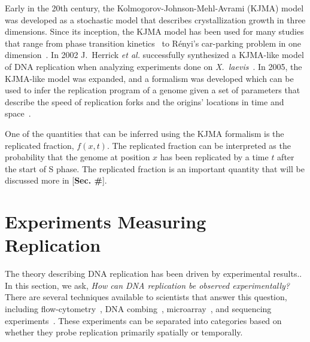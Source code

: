 	Early in the 20th century, the Kolmogorov-Johnson-Mehl-Avrami (KJMA) model was developed as a stochastic model that describes crystallization growth in three dimensions\cite{Kolmogorov, JohnsonAndMehl, AvramiI, AvramiII, AvramiIII}.
	Since its inception, the KJMA model has been used for many studies that range from phase transition kinetics~\cite{AlloyPhaseTransitions} to R{\'e}nyi's car-parking problem in one dimension~\cite{CarParking}.
	In 2002 J.~Herrick \emph{et al.} successfully synthesized a KJMA-like model of DNA replication when analyzing experiments done on \emph{X.~laevis}~\cite{KJMA2002}.
	In 2005, the KJMA-like model was expanded, and a formalism was developed which can be used to infer the replication program of a genome given a set of parameters that describe the speed of replication forks and the origins' locations in time and space~\cite{KJMA1, KJMA2}.
	
	One of the quantities that can be inferred using the KJMA formalism is the replicated fraction, $f(x,t)$.
	The replicated fraction can be interpreted as the probability that the genome at position $x$ has been replicated by a time $t$ after the start of S phase.
	The replicated fraction is an important quantity that will be discussed more in [\textbf{Sec. \#}].
	
	
	\section{Experiments Measuring Replication}
	\label{sec:Experiments}
	
	The theory describing DNA replication has been driven by experimental results..
	In this section, we ask, \emph{How can DNA replication be observed experimentally?}
	There are several techniques available to scientists that answer this question, including flow-cytometry~\cite{DeepSeq}, DNA combing~\cite{DNACombing}, microarray~\cite{MicroarrayReview, McCuneMicroArray}, and sequencing experiments~\cite{StochasticTermination,DeepSeq}.
	These experiments can be separated into categories based on whether they probe replication primarily spatially or temporally.
	
